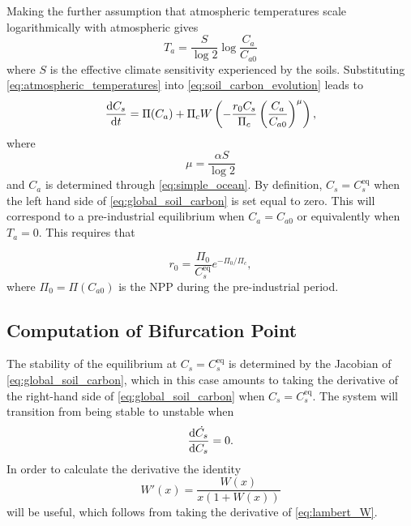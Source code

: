 Making the further assumption that atmospheric temperatures scale logarithmically with atmospheric  \parencite{Pierrehumbert2010} gives
\begin{equation}
  \label{eq:atmospheric_temperatures}
  T_a = \frac{S}{\log 2} \log \frac{C_a}{C_{a0}} 
\end{equation}
where $S$ is the effective climate sensitivity experienced by the soils. Substituting \cref{eq:atmospheric_temperatures} into \cref{eq:soil_carbon_evolution} 
leads to
\begin{equation}
  \label{eq:global_soil_carbon}
  \dv{C_s}{t} = \Pi(C_a) + \Pi_c W\left(-\frac{r_0C_s}{\Pi_c} \left(\frac{C_a}{C_{a0}}\right)^\mu \right),
\end{equation}
where
\begin{equation}
  \label{eq:mu_definition}
  \mu = \frac{\alpha S}{\log 2}
\end{equation}
and $C_a$ is determined through \cref{eq:simple_ocean}. By definition, $C_s = C_s^{\mathrm{eq}}$ when the left hand side of \cref{eq:global_soil_carbon} is set equal to zero.
This will correspond to a pre-industrial equilibrium when $C_a = C_{a0}$ or equivalently when $T_a = 0$. This requires that 

\begin{equation}
  r_0 = \frac{\Pi_0}{C_s^{\mathrm{eq}}}e^{-\Pi_0/\Pi_c}, 
\end{equation}
where $\Pi_0 = \Pi\left(C_{a0}\right)$ is the NPP during the pre-industrial period.


\subsection{Computation of Bifurcation Point}
\label{sec:computation_of_bifurcation_point}
The stability of the equilibrium at $C_s = C_s^{\mathrm{eq}}$ is determined by the Jacobian of \cref{eq:global_soil_carbon}, which in this case amounts to
taking the derivative of the right-hand side of \cref{eq:global_soil_carbon} when $C_s = C_s^{\mathrm{eq}}$. The system will transition from being stable to unstable when
\begin{equation*}
  \dv{\dot{C_s}}{C_s} = 0.
\end{equation*}
In order to calculate the derivative the identity
\begin{equation}
  \label{eq:derivative_of_lambert_W}
  W'(x) = \frac{W(x)}{x\left(1 + W\left(x\right)\right)}
\end{equation}
will be useful, which follows from taking the derivative of \cref{eq:lambert_W}.


